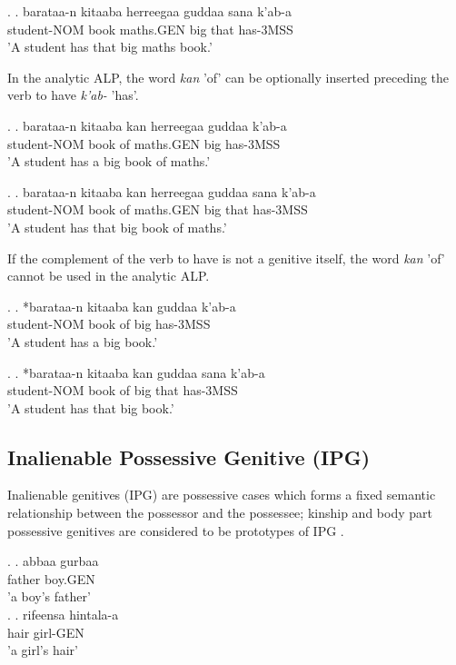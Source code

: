 \documentclass[11pt,a4paper]{article}
\begin{document}
	\ex.
	\ag.
	barataa-n kitaaba herreegaa guddaa sana k'ab-a\\
	student-NOM book maths.GEN big that has-3MSS\\
	'A student has that big maths book.'
	
	In the analytic ALP, the word \emph{kan} 'of' can be optionally inserted preceding the verb to have \emph{k'ab-} 'has'.
	
	\ex.
	\ag.
	barataa-n kitaaba kan herreegaa guddaa k'ab-a\\
	student-NOM book of maths.GEN big has-3MSS\\
	'A student has a big book of maths.'
	
	\ex.
	\ag.
	barataa-n kitaaba kan herreegaa guddaa sana k'ab-a\\
	student-NOM book of maths.GEN big that has-3MSS\\
	'A student has that big book of maths.'
	
	If the complement of the verb to have is not a genitive itself, the word \emph{kan} 'of' cannot be used in the analytic ALP.
	
	\ex.
	\ag.
	*barataa-n kitaaba kan guddaa k'ab-a\\
	student-NOM book of big has-3MSS\\
	'A student has a big book.'
	
	\ex.
	\ag.
	*barataa-n kitaaba kan guddaa sana k'ab-a\\
	student-NOM book of big that has-3MSS\\
	'A student has that big book.'
	
	
	\subsection{Inalienable Possessive Genitive (IPG)}
	
	Inalienable genitives (IPG) are possessive cases which forms a fixed semantic relationship between the possessor and the  possessee; kinship and body part possessive genitives are considered to be prototypes of IPG \cite[161]{gebregziabher2012alienable}. 
	
	\ex.
	\ag.
	abbaa gurbaa\\
	father boy.GEN\\
	'a boy's father'\\
	
	\ex.
	\ag.
	rifeensa hintala-a\\
	hair girl-GEN\\
	'a girl's hair'\\
	
\end{document}
